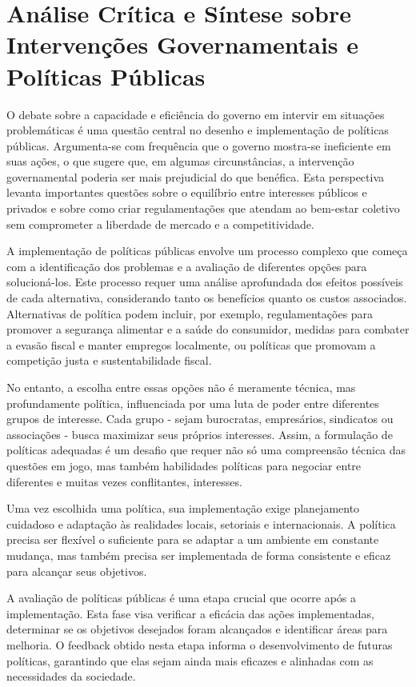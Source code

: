 \documentclass[
   article,       
   12pt,          
   oneside,       
   a4paper,       
   english,       
   brazil,        
   sumario=tradicional
   ]{abntex2}
\begin{document}
\section{Análise Crítica e Síntese sobre Intervenções Governamentais e Políticas Públicas}

O debate sobre a capacidade e eficiência do governo em intervir em situações problemáticas é uma questão central no desenho e implementação de políticas públicas. Argumenta-se com frequência que o governo mostra-se ineficiente em suas ações, o que sugere que, em algumas circunstâncias, a intervenção governamental poderia ser mais prejudicial do que benéfica. Esta perspectiva levanta importantes questões sobre o equilíbrio entre interesses públicos e privados e sobre como criar regulamentações que atendam ao bem-estar coletivo sem comprometer a liberdade de mercado e a competitividade.

A implementação de políticas públicas envolve um processo complexo que começa com a identificação dos problemas e a avaliação de diferentes opções para solucioná-los. Este processo requer uma análise aprofundada dos efeitos possíveis de cada alternativa, considerando tanto os benefícios quanto os custos associados. Alternativas de política podem incluir, por exemplo, regulamentações para promover a segurança alimentar e a saúde do consumidor, medidas para combater a evasão fiscal e manter empregos localmente, ou políticas que promovam a competição justa e sustentabilidade fiscal.

No entanto, a escolha entre essas opções não é meramente técnica, mas profundamente política, influenciada por uma luta de poder entre diferentes grupos de interesse. Cada grupo - sejam burocratas, empresários, sindicatos ou associações - busca maximizar seus próprios interesses. Assim, a formulação de políticas adequadas é um desafio que requer não só uma compreensão técnica das questões em jogo, mas também habilidades políticas para negociar entre diferentes e muitas vezes conflitantes, interesses.

Uma vez escolhida uma política, sua implementação exige planejamento cuidadoso e adaptação às realidades locais, setoriais e internacionais. A política precisa ser flexível o suficiente para se adaptar a um ambiente em constante mudança, mas também precisa ser implementada de forma consistente e eficaz para alcançar seus objetivos.

A avaliação de políticas públicas é uma etapa crucial que ocorre após a implementação. Esta fase visa verificar a eficácia das ações implementadas, determinar se os objetivos desejados foram alcançados e identificar áreas para melhoria. O feedback obtido nesta etapa informa o desenvolvimento de futuras políticas, garantindo que elas sejam ainda mais eficazes e alinhadas com as necessidades da sociedade.
\end{document}
